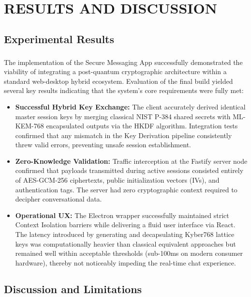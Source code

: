 \chapter{\MakeUppercase{Results and Discussion}}

\section{Experimental Results}
\paragraph{}
The implementation of the Secure Messaging App successfully demonstrated the viability of integrating a post-quantum cryptographic architecture within a standard web-desktop hybrid ecosystem. Evaluation of the final build yielded several key results indicating that the system's core requirements were fully met:

\begin{itemize}
    \item \textbf{Successful Hybrid Key Exchange:} The client accurately derived identical master session keys by merging classical NIST P-384 shared secrets with ML-KEM-768 encapsulated outputs via the HKDF algorithm. Integration tests confirmed that any mismatch in the Key Derivation pipeline consistently threw valid errors, preventing unsafe session establishment.
    \item \textbf{Zero-Knowledge Validation:} Traffic interception at the Fastify server node confirmed that payloads transmitted during active sessions consisted entirely of AES-GCM-256 ciphertexts, public initialization vectors (IVs), and authentication tags. The server had zero cryptographic context required to decipher conversational data.
    \item \textbf{Operational UX:} The Electron wrapper successfully maintained strict Context Isolation barriers while delivering a fluid user interface via React. The latency introduced by generating and decapsulating Kyber768 lattice keys was computationally heavier than classical equivalent approaches but remained well within acceptable thresholds (sub-100ms on modern consumer hardware), thereby not noticeably impeding the real-time chat experience.
\end{itemize}

\section{Discussion and Limitations}
